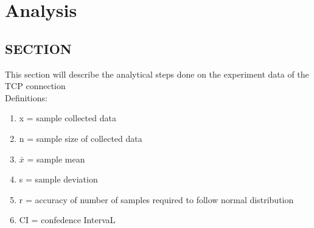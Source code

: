 \documentclass[aps,letterpaper,10pt]{revtex4}
\begin{document}
\begin{figure}[htp]
\begin{center}
    \end{center}
\end{figure}

\newpage
\section{Analysis}
    \subsection{SECTION}
This section will describe the analytical steps done on the experiment data of the TCP connection\\
Definitions:
    \begin{enumerate}
        \item x = sample collected data
        \item n = sample size of collected data
        \item $\bar{x}$ = sample mean 
        \item s = sample deviation 
        \item r = accuracy of number of samples required to follow normal distribution 
        \item CI = confedence IntervaL 
    \end{enumerate}
\end{document}
